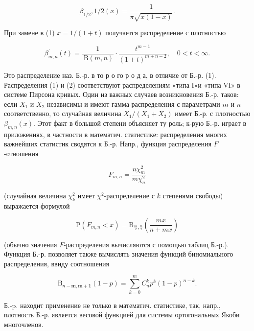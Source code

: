 \documentclass[10pt]{article}
\begin{document}
\[

\beta_{1 / 2}, 1 / 2(x)=\frac{1}{\pi \sqrt{x(1-x)}} .

\]



При замене в (1) $x=1 /(1+t)$ получается распределение с плотностью



\[

\beta_{m, n}^{\prime}(t)=\frac{1}{\mathrm{~B}(m, n)} \cdot \frac{t^{m-1}}{(1+t)^{m+n-2}}, \quad 0<t<\infty .

\]



Это распределение наз. Б.-р. в то р о го р о д а, в отличие от Б.-р. (1). Распределения (1) и (2) соответствуют распределениям «типа I»и «типа VI» в системе Пирсона кривых. Один из важных случаев возникновения Б.-р. таков: если $X_{1}$ и $X_{2}$ независимы и имеют гамма-распределения с параметрами $m$ и $n$ соответственно, то случайная величина $X_{1} /\left(X_{1}+X_{2}\right)$ имеет Б.-р. с плотностью $\beta_{m, n}(x)$. Этот факт в большой степени объясняет ту роль; к-рую Б.-р. играет в приложениях, в частности в математич. статистике: распределения многих важнейших статистик сводятся к Б.-р. Напр., функция распределения $F$-отношения



\[

F_{m, n}=\frac{n \chi_{m}^{2}}{m \chi_{n}^{2}}

\]



(случайная величина $\chi_{k}^{2}$ имеет $\chi^{2}$-распределение с $k$ степенями свободы) выражается формулой



\[

\mathrm{P}\left(F_{m, n}<x\right)=\mathrm{B}_{\frac{m}{2}, \frac{n}{2}}\left(\frac{m x}{n+m x}\right)

\]



(обычно значения $F$-распределения вычисляются с помощью таблиц Б.-р.). Функция Б.-р. позволяет также вычислять значения функций биномиального распределения, ввиду соотношения



\[

\mathrm{B}_{n-\boldsymbol{m}, \boldsymbol{m + 1}}(1-p)=\sum_{k=0}^{m} C_{n}^{k} p^{k}(1-p)^{n-k} .

\]



Б.-p. находит применение не только в математич. статистике, так, напр., плотность Б.-р. является весовой функцией для системы ортогональных Якоби многочленов.
\end{document}
